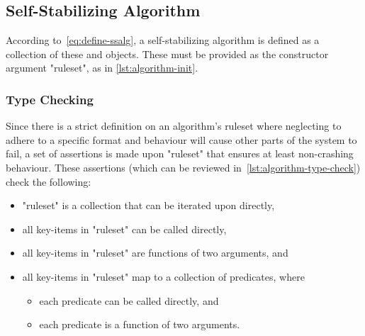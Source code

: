 \subsection{Self-Stabilizing Algorithm}
\label{sec:logic-repr:self-stab-algor}

According to~\eqref{eq:define-ssalg},
  a self-stabilizing algorithm is defined as a collection
  of these  and  objects.
These must be provided as the constructor argument "ruleset",
  as in \autoref{lst:algorithm-init}.


\subsubsection{Type Checking}
\label{sec:logic-repr:self-stab-algor:type-checking}

Since there is a strict definition on an algorithm's ruleset
  where neglecting to adhere to a specific format and behaviour
  will cause other parts of the system to fail,
  a set of assertions is made upon "ruleset" that ensures at least non-crashing behaviour.
These assertions (which can be reviewed in~\autoref{lst:algorithm-type-check}) check the following:
\begin{itemize}
\item "ruleset" is a collection that can be iterated upon directly,
\item all key-items in "ruleset" can be called directly,
\item all key-items in "ruleset" are functions of two arguments, and
\item all key-items in "ruleset" map to a collection of predicates, where
  \begin{itemize}
  \item each predicate can be called directly, and
  \item each predicate is a function of two arguments.
  \end{itemize}
\end{itemize}


